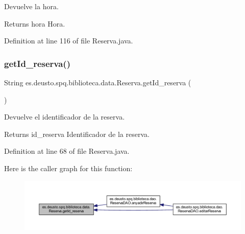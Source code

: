 Devuelve la hora. \begin{DoxyReturn}{Returns}
hora Hora. 
\end{DoxyReturn}


Definition at line 116 of file Reserva.\+java.

\mbox{\label{classes_1_1deusto_1_1spq_1_1biblioteca_1_1data_1_1_reserva_a50da30de128069b7e793e72a10c0cdd9}} 
\subsubsection{\texorpdfstring{get\+Id\+\_\+reserva()}{getId\_reserva()}}
{\footnotesize\ttfamily String es.\+deusto.\+spq.\+biblioteca.\+data.\+Reserva.\+get\+Id\+\_\+reserva (\begin{DoxyParamCaption}{ }\end{DoxyParamCaption})}

Devuelve el identificador de la reserva. \begin{DoxyReturn}{Returns}
id\+\_\+reserva Identificador de la reserva. 
\end{DoxyReturn}


Definition at line 68 of file Reserva.\+java.

Here is the caller graph for this function\+:
\nopagebreak
\begin{figure}[H]
\begin{center}
\leavevmode
\includegraphics[width=350pt]{classes_1_1deusto_1_1spq_1_1biblioteca_1_1data_1_1_reserva_a50da30de128069b7e793e72a10c0cdd9_icgraph}
\end{center}
\end{figure}
\mbox{\label{classes_1_1deusto_1_1spq_1_1biblioteca_1_1data_1_1_reserva_a011ade5ee624395a738a300551f0413e}} 
